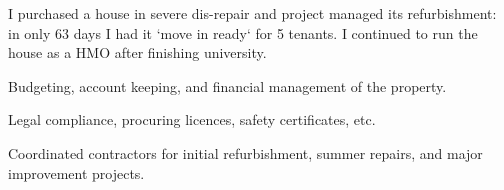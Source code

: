 I purchased a house in severe dis-repair and project managed its refurbishment: in only 63 days I had it `move in ready` for 5 tenants. I continued to run the house as a HMO after finishing university.
\vspace{0.25em}
\begin{tightemize}
  \item Budgeting, account keeping, and financial management of the property.
  \item Legal compliance, procuring licences, safety certificates, etc.
  \item Coordinated contractors for initial refurbishment, summer repairs, and major improvement projects.
\end{tightemize}
\sectionsep{}
